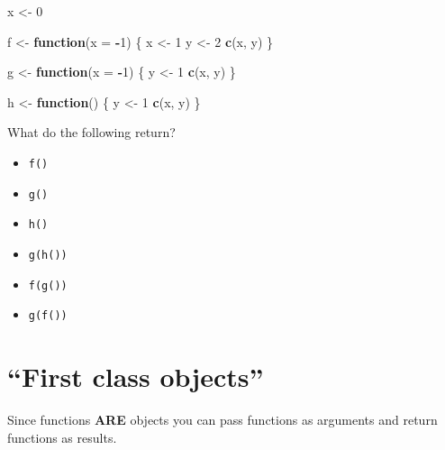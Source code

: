 \documentclass[]{book}
\newenvironment{Shaded}{\begin{snugshade}}{\end{snugshade}}
\newcommand{\KeywordTok}[1]{\textcolor[rgb]{0.13,0.29,0.53}{\textbf{#1}}}
\newcommand{\DataTypeTok}[1]{\textcolor[rgb]{0.13,0.29,0.53}{#1}}
\newcommand{\DecValTok}[1]{\textcolor[rgb]{0.00,0.00,0.81}{#1}}
\newcommand{\StringTok}[1]{\textcolor[rgb]{0.31,0.60,0.02}{#1}}
\newcommand{\ControlFlowTok}[1]{\textcolor[rgb]{0.13,0.29,0.53}{\textbf{#1}}}
\newcommand{\OperatorTok}[1]{\textcolor[rgb]{0.81,0.36,0.00}{\textbf{#1}}}
\newcommand{\NormalTok}[1]{#1}
\providecommand{\tightlist}{%
  \setlength{\itemsep}{0pt}\setlength{\parskip}{0pt}}
\begin{document}
\begin{Shaded}
\begin{Highlighting}[]
\NormalTok{x <-}\StringTok{ }\DecValTok{0}

\NormalTok{f <-}\StringTok{ }\ControlFlowTok{function}\NormalTok{(}\DataTypeTok{x =} \OperatorTok{-}\DecValTok{1}\NormalTok{) \{}
\NormalTok{  x <-}\StringTok{ }\DecValTok{1}
\NormalTok{  y <-}\StringTok{ }\DecValTok{2}
  \KeywordTok{c}\NormalTok{(x, y)}
\NormalTok{\}}

\NormalTok{g <-}\StringTok{ }\ControlFlowTok{function}\NormalTok{(}\DataTypeTok{x =} \OperatorTok{-}\DecValTok{1}\NormalTok{) \{}
\NormalTok{  y <-}\StringTok{ }\DecValTok{1}
  \KeywordTok{c}\NormalTok{(x, y)}
\NormalTok{\}}

\NormalTok{h <-}\StringTok{ }\ControlFlowTok{function}\NormalTok{() \{}
\NormalTok{  y <-}\StringTok{ }\DecValTok{1}
  \KeywordTok{c}\NormalTok{(x, y)}
\NormalTok{\}}
\end{Highlighting}
\end{Shaded}

What do the following return?

\begin{itemize}
\tightlist
\item
  \texttt{f()}
\item
  \texttt{g()}
\item
  \texttt{h()}
\item
  \texttt{g(h())}
\item
  \texttt{f(g())}
\item
  \texttt{g(f())}
\end{itemize}

\section{\texorpdfstring{``First class
objects''}{First class objects}}\label{first-class-objects}

Since functions \textbf{ARE} objects you can pass functions as arguments
and return functions as results.
\end{document}
